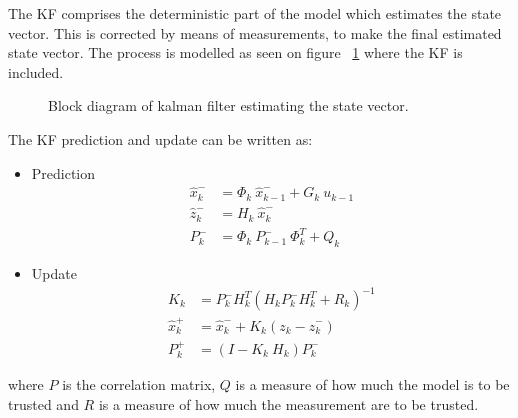 The \ac{KF} comprises the deterministic part of the model which estimates the state vector. This is corrected by means of measurements, to make the final estimated state vector. The process is modelled as seen on figure ~\ref{fig:blockkf} where the \ac{KF} is included.

\begin{figure}
	\centering
	
	\caption{Block diagram of kalman filter estimating the state vector.}
	\label{fig:blockkf}
\end{figure}

The \ac{KF} prediction and update can be written as:
\begin{itemize}
\item Prediction
\begin{align}
\hat x_{k}^- &= \Phi_{k}\ \hat x_{k-1}^- + G_{k}\ u_{k-1}\nonumber\\
\hat z_{k}^- &= H_{k}\ \hat x_{k}^-\nonumber\\
P_{k}^- &= \Phi_{k}\ P_{k-1}^-\ \Phi_{k}^T + Q_{k}\nonumber
\end{align}

\item Update
\begin{align}
K_{k} &= P_{k}^- H_{k}^T(H_{k} P_{k}^- H_{k}^T+R_{k})^{-1}\nonumber\\
\hat x_{k}^+ &= \hat x_{k}^- + K_{k}(z_{k}-\hat z_{k}^-)\nonumber\\
P_{k}^+ &= (I-K_{k}\ H_{k})P_{k}^-\nonumber
\end{align}
\end{itemize}
where $P$ is the correlation matrix, $Q$ is a measure of how much the model is to be trusted and $R$ is a measure of how much the measurement are to be trusted.
